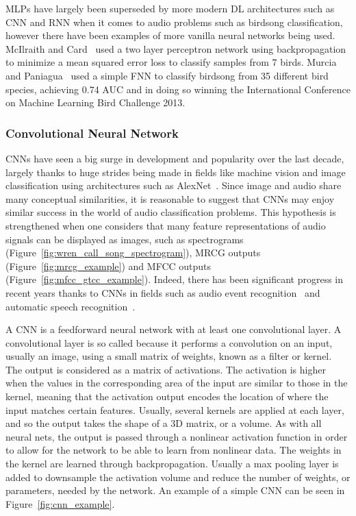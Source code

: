 MLPs have largely been superseded by more modern DL architectures such as CNN and
RNN when it comes to audio problems such as birdsong classification, however
there have been examples of more vanilla neural networks being used. McIlraith
and Card~\cite{mcilraith1997birdsong} used a two layer perceptron network using
backpropagation to minimize a mean squared error loss to classify samples from 7
birds. Murcia and Paniagua~\cite{murcia2013bird} used a simple FNN to classify
birdsong from 35 different bird species, achieving 0.74 AUC and in doing so
winning the International Conference on Machine Learning Bird Challenge 2013.

\subsubsection{Convolutional Neural Network}

CNNs have seen a big surge in development and popularity over the last decade,
largely thanks to huge strides being made in fields like machine vision and
image classification using architectures such as
AlexNet~\cite{krizhevsky2012imagenet}. Since image and audio share many
conceptual similarities, it is reasonable to suggest that CNNs may enjoy similar
success in the world of audio classification problems. This hypothesis is
strengthened when one considers that many feature representations of audio
signals can be displayed as images, such as spectrograms
(Figure~\ref{fig:wren_call_song_spectrogram}), MRCG outputs
(Figure~\ref{fig:mrcg_example}) and MFCC outputs
(Figure~\ref{fig:mfcc_gtcc_example}). Indeed, there has been significant
progress in recent years thanks to CNNs in fields such as audio event
recognition~\cite{takahashi2017aenet} and automatic speech
recognition~\cite{sercu2016very}.

A CNN is a feedforward neural network with at least one convolutional layer. A
convolutional layer is so called because it performs a convolution on an input,
usually an image, using a small matrix of weights, known as a filter or kernel.
The output is considered as a matrix of activations. The activation is higher
when the values in the corresponding area of the input are similar to those in
the kernel, meaning that the activation output encodes the location of where the
input matches certain features. Usually, several kernels are applied at each
layer, and so the output takes the shape of a 3D matrix, or a volume. As with
all neural nets, the output is passed through a nonlinear activation function in
order to allow for the network to be able to learn from nonlinear data. The
weights in the kernel are learned through backpropagation. Usually a max
pooling layer is added to downsample the activation volume and reduce
the number of weights, or parameters, needed by the network. An example of a
simple CNN can be seen in Figure~\ref{fig:cnn_example}.

